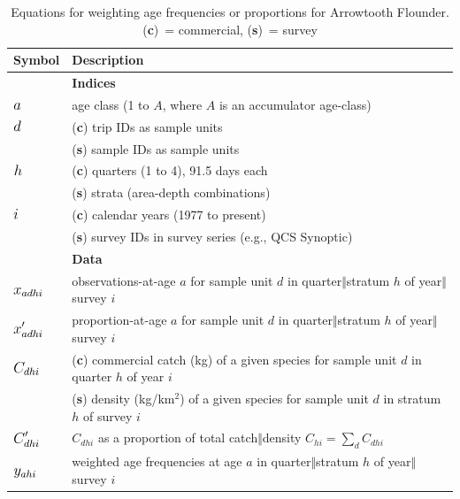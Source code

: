 \documentclass[11pt]{book}\usepackage[]{graphicx}\usepackage[]{color}
\newcommand{\eor}[2]{{#1$\Vert$#2}}
\newcommand{\bM}[1]{\mathlarger{\mathlarger{#1}}}
\newcommand{\fishname}{Arrowtooth Flounder}
\begin{document}
\usefont{\encodingdefault}{\familydefault}{\seriesdefault}{\shapedefault}\small
\begin{longtable}[1]{l>{\raggedright\arraybackslash}p{} }
\caption{Equations for weighting age frequencies or proportions for Arrowtooth Flounder.\\(\textbf{c})~= commercial, (\textbf{s})~= survey}
\label{tab:wtdAges} \\
\hline
Symbol & Description \\ %
\hline
& \textbf{Indices} \\
$\bM{a}$ & age class (1 to $A$, where $A$ is an accumulator age-class) \\
$\bM{d}$ & (\textbf{c}) trip IDs as sample units \\
& (\textbf{s}) sample IDs as sample units \\
$\bM{h}$ & (\textbf{c}) quarters (1 to 4), 91.5 days each \\
& (\textbf{s}) strata (area-depth combinations) \\
$\bM{i}$ & (\textbf{c}) calendar years (1977 to present) \\
& (\textbf{s}) survey IDs in survey series (e.g., QCS Synoptic) \\ %
\hline
& \textbf{Data} \\
$\bM{x_{adhi}}$ & observations-at-age $a$ for sample unit $d$ in \eor{quarter}{stratum} $h$ of \eor{year}{survey} $i$ \\
$\bM{x^\prime_{adhi}}$ & proportion-at-age $a$ for sample unit $d$ in \eor{quarter}{stratum} $h$ of \eor{year}{survey} $i$ \\
$\bM{C_{dhi}}$ & (\textbf{c}) commercial catch (kg) of a given species for sample unit $d$ in quarter $h$ of year $i$ \\
& (\textbf{s}) density (kg/km$^2$) of a given species for sample unit $d$ in stratum $h$ of survey $i$ \\
$\bM{C^\prime_{dhi}}$ & $C_{dhi}$ as a proportion of total \eor{catch}{density} $C_{hi} = \sum_{d} C_{dhi}$ \\
$\bM{y_{ahi}}$ & weighted age frequencies at age $a$ in \eor{quarter}{stratum} $h$ of \eor{year}{survey} $i$ \\

\end{longtable}
\end{document}

